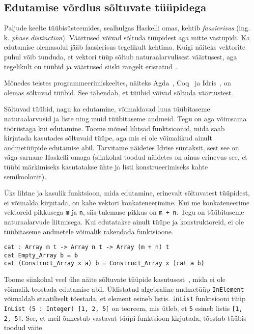 \documentclass[12pt]{article}
\begin{document}
    \subsection{Edutamise võrdlus sõltuvate tüüpidega}\label{soltuvad}
      Paljude keelte tüübisüsteemides, sealhulgas Haskelli omas, kehtib \textit{faasierisus} (ing. k. \textit{phase distinction}). Väärtused võivad sõltuda tüüpidest aga mitte vastupidi. Ka edutamise olemasolul jääb faasierisus tegelikult kehtima. Kuigi näiteks vektorite puhul võib tunduda, et vektori tüüp sõltub naturaalarvulisest väärtusest, aga tegelikult on tüübid ja väärtused siiski rangelt eristatud~\cite{Giv}.

      Mõnedes teistes programmeerimiskeeltes, näiteks Agda~\cite{Agd}, Coq~\cite{The_Coq} ja Idris~\cite{The_Idr}, on olemas sõltuvad tüübid. See tähendab, et tüübid võivad sõltuda väärtustest.

      Sõltuvad tüübid, nagu ka edutamine, võimaldavad luua tüübitaseme naturaalarvusid ja liste ning muid tüübitaseme andmeid. Tegu on aga võimsama tööriistaga kui edutamine. Toome mõned lihtsad funktsioonid, mida saab kirjutada kasutades sõltuvaid tüüpe, aga mis ei ole võimalikud ainult andmetüüpide edutamise abil. Tarvitame näidetes Idrise süntaksit, sest see on väga sarnane Haskelli omaga (siinkohal toodud näidetes on ainus erinevus see, et tüübi märkimiseks kasutatakse ühte ja listi konstrueerimiseks kahte semikoolonit).

      Üks lihtne ja kasulik funktsioon, mida edutamine, erinevalt sõltuvatest tüüpidest, ei võimalda kirjutada, on kahe vektori konkateneerimine. Kui me konkateneerime vektoreid pikkusega \verb!m! ja \verb!n!, siis tulemuse pikkus on \verb!m + n!. Tegu on tüübitaseme naturaalarvude liitmisega. Kui edutatakse ainult tüüpe ja konstruktoreid, ei ole tüübitaseme andmetele võimalik rakendada funktsioone.

      \begin{verbatim}cat : Array m t -> Array n t -> Array (m + n) t
cat Empty_Array b = b
cat (Construct_Array x a) b = Construct_Array x (cat a b)\end{verbatim}

      Toome siinkohal veel ühe näite sõltuvate tüüpide kasutusest~\cite{The_Idr}, mida ei ole võimalik teostada edutamise abil. Üldistatud algebraline andmetüüp \verb!InElement! võimaldab staatiliselt tõestada, et element esineb listis. \verb!inList! funktsiooni tüüp \verb!InList (5 : Integer) [1, 2, 5]! on teoreem, mis ütleb, et \verb!5! esineb listis \verb![1, 2, 5]!. See, et meil õnnestub vastavat tüüpi funktsioon kirjutada, tõestab tüübis toodud väite.
\end{document}
